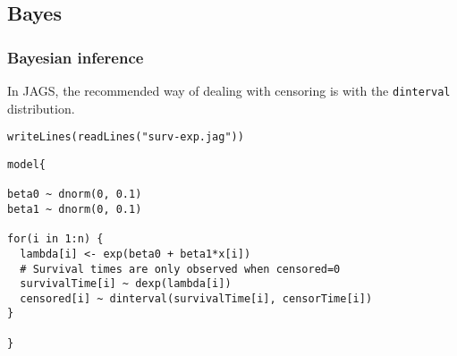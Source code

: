 \documentclass[color=usenames,dvipsnames]{beamer}\usepackage[]{graphicx}\usepackage[]{xcolor}
\makeatletter
\newcommand{\hlsng}[1]{\textcolor[rgb]{0.749,0.012,0.012}{#1}}%
\newcommand{\hldef}[1]{\textcolor[rgb]{0,0,0}{#1}}%
\newcommand{\hlkwd}[1]{\textcolor[rgb]{0.004,0.004,0.506}{#1}}%
\newenvironment{kframe}{%
 \def\at@end@of@kframe{}%
 \ifinner\ifhmode%
  \def\at@end@of@kframe{\end{minipage}}%
  \begin{minipage}{\columnwidth}%
 \fi\fi%
 \def\FrameCommand##1{\hskip\@totalleftmargin \hskip-\fboxsep
 \colorbox{shadecolor}{##1}\hskip-\fboxsep
     \hskip-\linewidth \hskip-\@totalleftmargin \hskip\columnwidth}%
 \MakeFramed {\advance\hsize-\width
   \@totalleftmargin\z@ \linewidth\hsize
   \@setminipage}}%
 {\par\unskip\endMakeFramed%
 \at@end@of@kframe}
\newenvironment{knitrout}{}{} %
\newcommand{\inr}[1]{\colorbox{inlinecolor}{\texttt{#1}}}
\makeatother
\begin{document}
\subsection{Bayes}


\begin{frame}[fragile]
  \frametitle{Bayesian inference}
  In JAGS, the recommended way of dealing with censoring is with the
  \inr{dinterval} distribution. 
\begin{knitrout}
\color{fgcolor}\begin{kframe}
\begin{alltt}
\hlkwd{writeLines}\hldef{(}\hlkwd{readLines}\hldef{(}\hlsng{"surv-exp.jag"}\hldef{))}
\end{alltt}
\end{kframe}
\end{knitrout}
\begin{knitrout}\footnotesize
{}\color{fgcolor}\begin{kframe}
\begin{verbatim}
model{

beta0 ~ dnorm(0, 0.1)
beta1 ~ dnorm(0, 0.1)

for(i in 1:n) {
  lambda[i] <- exp(beta0 + beta1*x[i])
  # Survival times are only observed when censored=0 
  survivalTime[i] ~ dexp(lambda[i])
  censored[i] ~ dinterval(survivalTime[i], censorTime[i])
}

}
\end{verbatim}
\end{kframe}
\end{knitrout}
\end{frame}
\end{document}
